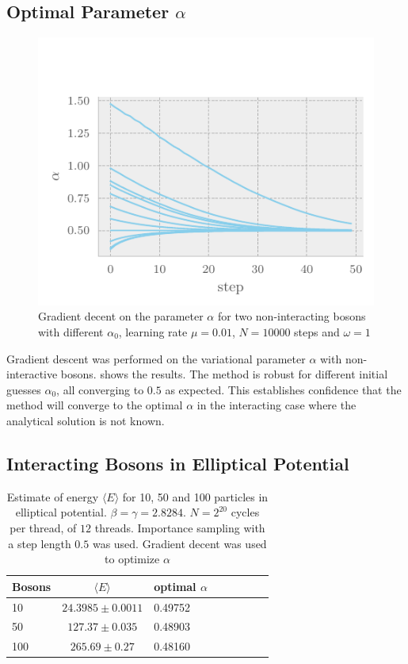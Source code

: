 \subsection{Optimal Parameter \(\alpha\)}
\begin{figure}[ht]
	\includegraphics[]{figures/gd.pdf}
	\centering
	\caption{Gradient decent on the parameter $\alpha$ for two non-interacting
      bosons with different \(\alpha_{0}\), learning rate $\mu = 0.01$, $N = 10000$ steps and $\omega = 1$}
	\label{fig:gd}
\end{figure}

Gradient descent was performed on the variational parameter \(\alpha\) with
non-interactive bosons.  shows the results. The method is robust
for different initial guesses \(\alpha_{0}\), all converging to \(0.5\) as
expected. This establishes confidence that the method will converge to the
optimal \(\alpha\) in the interacting case where the analytical solution is not known.

\subsection{Interacting Bosons in Elliptical Potential}

\begin{table}[t]
	\begin{tabular}{lclclclc}
		\hline
		\hline
		Bosons & \(\langle E \rangle\) & optimal $\alpha$\\
		\hline
		10 & \(24.3985 \pm 0.0011\) & 0.49752\\
		50 & \(127.37 \pm 0.035\) & 0.48903\\
		100 & \(265.69 \pm 0.27\) & 0.48160\\
		\hline
	\end{tabular}
	\caption{Estimate of energy $\langle E \rangle$ for 10, 50 and 100 particles in elliptical potential. $\beta = \gamma = 2.8284$. $N = 2^20$ cycles per thread, of $12$ threads. Importance sampling with a step length $0.5$ was used. Gradient decent was used to optimize $\alpha$}
	\label{tab:energies}
\end{table}

